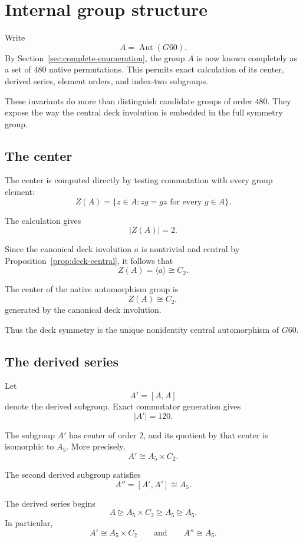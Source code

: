 \section{Internal group structure}
\label{sec:group-structure}

Write
\[
A=\operatorname{Aut}(G60).
\]
By Section~\ref{sec:complete-enumeration}, the group $A$ is now known
completely as a set of $480$ native permutations. This permits exact
calculation of its center, derived series, element orders, and
index-two subgroups.

These invariants do more than distinguish candidate groups of order
$480$. They expose the way the central deck involution is embedded in
the full symmetry group.

\subsection{The center}

The center is computed directly by testing commutation with every group
element:
\[
Z(A)
=
\{z\in A:zg=gz\text{ for every }g\in A\}.
\]

The calculation gives
\[
|Z(A)|=2.
\]

Since the canonical deck involution $a$ is nontrivial and central by
Proposition~\ref{prop:deck-central}, it follows that
\[
Z(A)=\langle a\rangle\cong C_2.
\]

\begin{proposition}
\label{prop:center}
The center of the native automorphism group is
\[
Z(A)\cong C_2,
\]
generated by the canonical deck involution.
\end{proposition}

Thus the deck symmetry is the unique nonidentity central automorphism of
$G60$.

\subsection{The derived series}

Let
\[
A'=[A,A]
\]
denote the derived subgroup. Exact commutator generation gives
\[
|A'|=120.
\]

The subgroup $A'$ has center of order $2$, and its quotient by that
center is isomorphic to $A_5$. More precisely,
\[
A'\cong A_5\times C_2.
\]

The second derived subgroup satisfies
\[
A''=[A',A']\cong A_5.
\]

\begin{theorem}
\label{thm:derived-series}
The derived series begins
\[
A
\trianglerighteq
A_5\times C_2
\trianglerighteq
A_5
\trianglerighteq
A_5.
\]
In particular,
\[
A'\cong A_5\times C_2
\qquad\text{and}\qquad
A''\cong A_5.
\]
\end{theorem}

